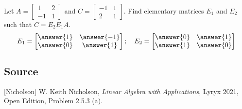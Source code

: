 \documentclass{ximera}
\author{}
\begin{document}
\begin{exercise}
Let $A=\begin{bmatrix}1 & 2\\-1 & 1\end{bmatrix}$ and $C=\begin{bmatrix}-1 & 1\\2 & 1\end{bmatrix}$.  Find elementary matrices $E_1$ and $E_2$ such that $C=E_2E_1A$.
$$E_1=\begin{bmatrix}\answer{1} & \answer{-1}\\\answer{0} & \answer{1}\end{bmatrix};\quad E_2=\begin{bmatrix}\answer{0} & \answer{1}\\\answer{1} & \answer{0}\end{bmatrix}$$

 \end{exercise}
 \subsection*{Source}
[Nicholson] W. Keith Nicholson, {\it Linear Algebra with Applications}, Lyryx 2021, Open Edition, Problem 2.5.3 (a).
\end{document}
